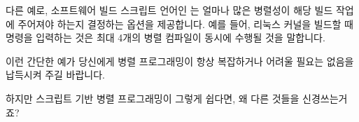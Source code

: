 다른 예로, 소프트웨어 빌드 스크립트 언어인  는 얼마나 많은 병렬성이
해당 빌드 작업에 주어져야 하는지 결정하는  옵션을 제공합니다.
예를 들어, 리눅스 커널을 빌드할 때  명령을 입력하는 것은 최대
4개의 병렬 컴파일이 동시에 수행될 것을 말합니다.

이런 간단한 예가 당신에게 병렬 프로그래밍이 항상 복잡하거나 어려울 필요는
없음을 납득시켜 주길 바랍니다.

\QuickQuiz{}
	하지만 스크립트 기반 병렬 프로그래밍이 그렇게 쉽다면, 왜 다른 것들을
	신경쓰는거죠?
	\iffalse

